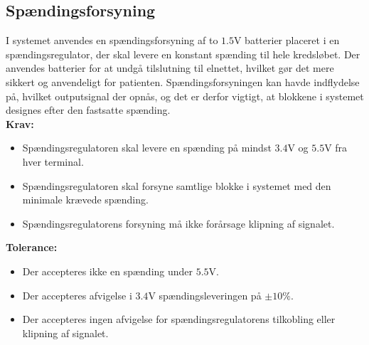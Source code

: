 \subsection{Spændingsforsyning}\label{Krav_spaending_spicifikt}
I systemet anvendes en spændingsforsyning af to $1.5$V batterier placeret i en spændingsregulator, der skal levere en konstant spænding til hele kredsløbet. Der anvendes batterier for at undgå tilslutning til elnettet, hvilket gør det mere sikkert og anvendeligt for patienten. Spændingsforsyningen kan havde indflydelse på, hvilket outputsignal der opnås, og det er derfor vigtigt, at blokkene i systemet designes efter den fastsatte spænding. \\
\noindent\textbf{Krav:}
\begin{itemize}
	\item Spændingsregulatoren skal levere en spænding på mindst $3.4$V og $5.5$V fra hver terminal.
	\item Spændingsregulatoren skal forsyne samtlige blokke i systemet med den minimale krævede spænding.
	\item Spændingsregulatorens forsyning må ikke forårsage klipning af signalet.
\end{itemize}
\noindent\textbf{Tolerance:}
\begin{itemize}
	\item Der accepteres ikke en spænding under $5.5$V.
	\item Der accepteres afvigelse i $3.4$V spændingsleveringen på $\pm10\%$.
	\item Der accepteres ingen afvigelse for spændingsregulatorens tilkobling eller klipning af signalet.
\end{itemize}
